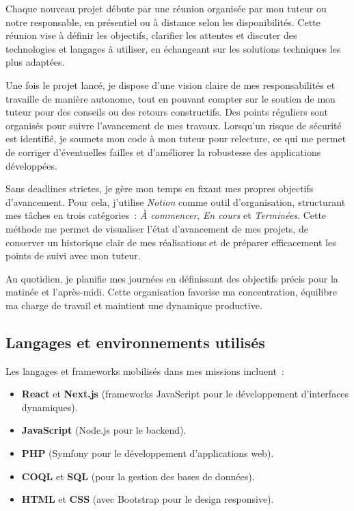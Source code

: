 Chaque nouveau projet débute par une réunion organisée par mon tuteur ou notre responsable, en présentiel ou à distance selon les disponibilités. Cette réunion vise à définir les objectifs, clarifier les attentes et discuter des technologies et langages à utiliser, en échangeant sur les solutions techniques les plus adaptées.

Une fois le projet lancé, je dispose d’une vision claire de mes responsabilités et travaille de manière autonome, tout en pouvant compter sur le soutien de mon tuteur pour des conseils ou des retours constructifs. Des points réguliers sont organisés pour suivre l’avancement de mes travaux. Lorsqu’un risque de sécurité est identifié, je soumets mon code à mon tuteur pour relecture, ce qui me permet de corriger d’éventuelles failles et d’améliorer la robustesse des applications développées.

Sans deadlines strictes, je gère mon temps en fixant mes propres objectifs d’avancement. Pour cela, j’utilise \textit{Notion} comme outil d’organisation, structurant mes tâches en trois catégories~: \textit{À commencer}, \textit{En cours} et \textit{Terminées}. Cette méthode me permet de visualiser l’état d’avancement de mes projets, de conserver un historique clair de mes réalisations et de préparer efficacement les points de suivi avec mon tuteur.

Au quotidien, je planifie mes journées en définissant des objectifs précis pour la matinée et l’après-midi. Cette organisation favorise ma concentration, équilibre ma charge de travail et maintient une dynamique productive.

\subsection{Langages et environnements utilisés}

Les langages et frameworks mobilisés dans mes missions incluent~:

\begin{itemize}
    \item \textbf{React} et \textbf{Next.js} (frameworks JavaScript pour le développement d’interfaces dynamiques).
    \item \textbf{JavaScript} (Node.js pour le backend).
    \item \textbf{PHP} (Symfony pour le développement d’applications web).
    \item \textbf{COQL} et \textbf{SQL} (pour la gestion des bases de données).
    \item \textbf{HTML} et \textbf{CSS} (avec Bootstrap pour le design responsive).
\end{itemize}

